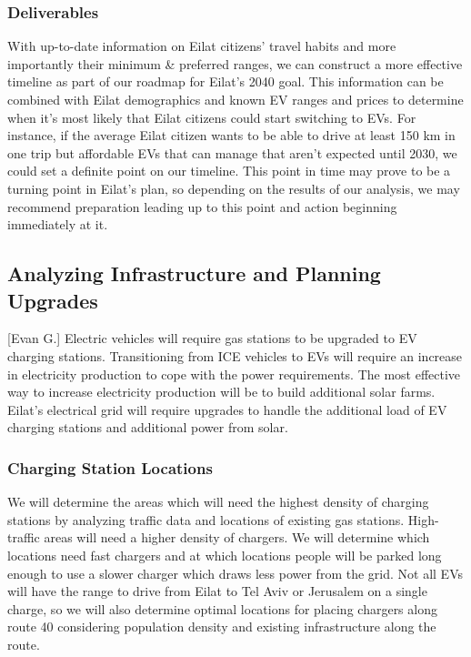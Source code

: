 \documentclass[12pt]{article}                         %
\begin{document}
\subsubsection{Deliverables}
With up-to-date information on Eilat citizens' travel habits and more importantly their minimum \& preferred ranges, we can construct a more effective timeline as part of our roadmap for Eilat's 2040 goal. This information can be combined with Eilat demographics and known EV ranges and prices to determine when it's most likely that Eilat citizens could start switching to EVs. For instance, if the average Eilat citizen wants to be able to drive at least 150 km in one trip but affordable EVs that can manage that aren't expected until 2030, we could set a definite point on our timeline. This point in time may prove to be a turning point in Eilat's plan, so depending on the results of our analysis, we may recommend preparation leading up to this point and action beginning immediately at it.

\subsection{Analyzing Infrastructure and Planning Upgrades}[Evan G.]
Electric vehicles will require gas stations to be upgraded to EV charging stations. Transitioning from ICE vehicles to EVs will require an increase in electricity production to cope with the power requirements. The most effective way to increase electricity production will be to build additional solar farms. Eilat's electrical grid will require upgrades to handle the additional load of EV charging stations and additional power from solar. 

\subsubsection{Charging Station Locations}
We will determine the areas which will need the highest density of charging stations by analyzing traffic data and locations of existing gas stations. High-traffic areas will need a higher density of chargers. We will determine which locations need fast chargers and at which locations people will be parked long enough to use a slower charger which draws less power from the grid. Not all EVs will have the range to drive from Eilat to Tel Aviv or Jerusalem on a single charge, so we will also determine optimal locations for placing chargers along route 40 considering population density and existing infrastructure along the route.
\end{document}
